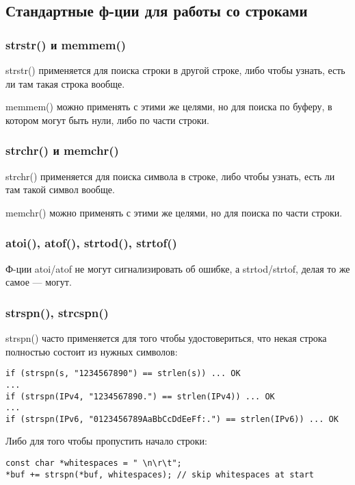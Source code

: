 ﻿\subsection{Стандартные ф-ции для работы со строками}

\subsubsection{strstr() и memmem()}

strstr() применяется для поиска строки в другой строке, либо чтобы узнать, есть ли там такая строка вообще.

memmem() можно применять с этими же целями, но для поиска по буферу, в котором могут быть нули,
либо по части строки.

\label{memchr}
\subsubsection{strchr() и memchr()}

strchr() применяется для поиска символа в строке, либо чтобы узнать, есть ли там такой символ вообще.

memchr() можно применять с этими же целями, но для поиска по части строки.

\subsubsection{atoi(), atof(), strtod(), strtof()}

Ф-ции atoi/atof не могут сигнализировать об ошибке, а strtod/strtof, делая то же самое --- могут.



\subsubsection{strspn(), strcspn()}

strspn() часто применяется для того чтобы удостовериться, что некая строка полностью состоит из
нужных символов:
    
\begin{lstlisting}
if (strspn(s, "1234567890") == strlen(s)) ... OK
...
if (strspn(IPv4, "1234567890.") == strlen(IPv4)) ... OK
...
if (strspn(IPv6, "0123456789AaBbCcDdEeFf:.") == strlen(IPv6)) ... OK
\end{lstlisting}

Либо для того чтобы пропустить начало строки:

\begin{lstlisting}
const char *whitespaces = " \n\r\t";
*buf += strspn(*buf, whitespaces); // skip whitespaces at start
\end{lstlisting}

